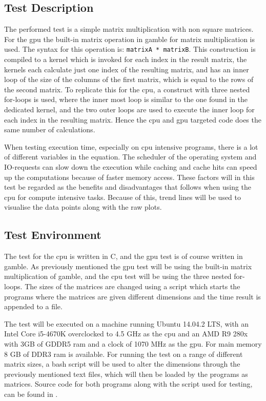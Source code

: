 \subsection*{Test Description} %
\label{sec:the_test}
The performed test is a simple matrix multiplication with non square matrices.
For the \acrshort{gpu} the built-in matrix operation in \gls{gamble} for matrix multiplication is used.
The syntax for this operation is: \texttt{matrixA * matrixB}.
This construction is compiled to a kernel which is invoked for each index in the result matrix, the kernels each calculate just one index of the resulting matrix, and has an inner loop of the size of the columns of the first matrix, which is equal to the rows of the second matrix.
To replicate this for the \acrshort{cpu}, a construct with three nested for-loops is used, where the inner most loop is similar to the one found in the dedicated kernel, and the two outer loops are used to execute the inner loop for each index in the resulting matrix.
Hence the \acrshort{cpu} and \acrshort{gpu} targeted code does the same number of calculations.

When testing execution time, especially on \acrshort{cpu} intensive programs, there is a lot of different variables in the equation.
The scheduler of the operating system and IO-requests can slow down the execution while caching and cache hits can speed up the computations because of faster memory access.
These factors will in this test be regarded as the benefits and disadvantages that follows when using the \acrshort{cpu} for compute intensive tasks.
Because of this, trend lines will be used to visualise the data points along with the raw plots.

\subsection*{Test Environment} %
\label{sub:test_environment}
The test for the \acrshort{cpu} is written in C, and the \acrshort{gpu} test is of course written in \gls{gamble}.
As previously mentioned the \acrshort{gpu} test will be using the built-in matrix multiplication of \gls{gamble}, and the \acrshort{cpu} test will be using the three nested for-loops.
The sizes of the matrices are changed using a script which starts the programs where the matrices are given different dimensions and the time result is appended to a file.

The test will be executed on a machine running Ubuntu 14.04.2 LTS, with an Intel Core i5-4670K overclocked to 4.5 GHz as the \acrshort{cpu} and an AMD R9 280x with 3GB of GDDR5 ram and a clock of 1070 MHz as the \acrshort{gpu}.
For main memory 8 GB of DDR3 ram is available.
For running the test on a range of different matrix sizes, a bash script will be used to alter the dimensions through the previously mentioned text files, which will then be loaded by the programs as matrices.
Source code for both programs along with the script used for testing, can be found in .

